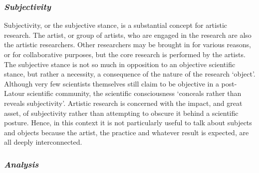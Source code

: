 \documentclass[12pt]{article}
\begin{document}
\subsubsection*{\emph{Subjectivity}}

Subjectivity, or the subjective stance, is a substantial concept for artistic research. The artist, or group of artists, who are engaged in the research are also the artistic researchers. Other researchers may be brought in for various reasons, or for collaborative purposes, but the core research is performed by the artists. The subjective stance is not so much in opposition to an objective scientific stance, but rather a necessity, a consequence of the nature of the research `object'. Although very few scientists themselves still claim to be objective in a post-Latour scientific community, the scientific consciousness `conceals rather than reveals subjectivity'.  Artistic research is concerned with the impact, and great asset, of subjectivity rather than attempting to obscure it behind a scientific posture. Hence, in this context it is not particularly useful to talk about subjects and objects because the artist, the practice and whatever result is expected, are all deeply interconnected. 


\subsubsection*{\emph{Analysis}}
\end{document}
